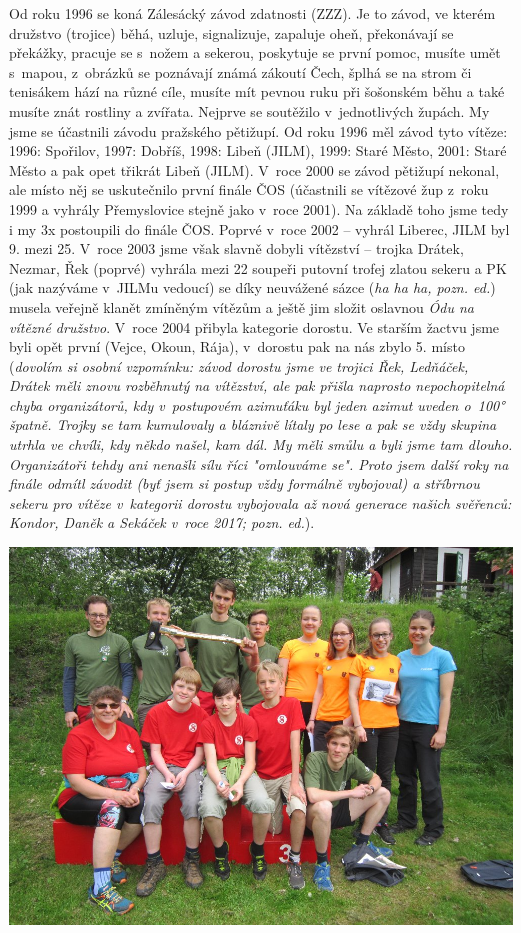 \documentclass[a5paper, 11pt, twoside]{article}
\begin{document}
Od roku 1996 se koná Zálesácký závod zdatnosti (ZZZ). Je to závod, ve
kterém družstvo (trojice) běhá, uzluje, signalizuje, zapaluje oheň,
překonávají se překážky, pracuje se s~nožem a sekerou, poskytuje se
první pomoc, musíte umět s~mapou, z~obrázků se poznávají známá zákoutí
Čech, šplhá se na strom či tenisákem hází na různé cíle, musíte mít
pevnou ruku při šošonském běhu a také musíte znát rostliny a zvířata.
Nejprve se soutěžilo v~jednotlivých župách. My jsme se účastnili závodu
pražského pětižupí. Od roku 1996 měl závod tyto vítěze: 1996: Spořilov,
1997: Dobříš, 1998: Libeň (JILM), 1999: Staré Město, 2001: Staré Město a
pak opet třikrát Libeň (JILM). V~roce 2000 se závod pětižupí nekonal,
ale místo něj se uskutečnilo první finále ČOS (účastnili se vítězové žup
z~roku 1999 a vyhrály Přemyslovice stejně jako v~roce 2001). Na základě
toho jsme tedy i my 3x postoupili do finále ČOS. Poprvé v~roce 2002 --
vyhrál Liberec, JILM byl 9. mezi 25. V~roce 2003 jsme však slavně dobyli
vítězství -- trojka Drátek, Nezmar, Řek (poprvé) vyhrála mezi 22 soupeři
putovní trofej zlatou sekeru a PK (jak nazýváme v~JILMu vedoucí) se díky
neuvážené sázce (\textit{ha ha ha, pozn. ed.}) musela veřejně klanět
zmíněným vítězům a ještě jim složit oslavnou \textit{Ódu na vítězné
družstvo}. V~roce 2004 přibyla kategorie dorostu. Ve starším žactvu jsme
byli opět první (Vejce, Okoun, Rája), v~dorostu pak na nás zbylo 5.
místo (\textit{dovolím si osobní vzpomínku: závod dorostu jsme ve trojici
Řek, Ledňáček, Drátek měli znovu rozběhnutý na vítězství, ale pak přišla
naprosto nepochopitelná chyba organizátorů, kdy v~postupovém azimuťáku
byl jeden azimut uveden o~100° špatně. Trojky se tam kumulovaly a
bláznivě lítaly po lese a pak se vždy skupina utrhla ve chvíli, kdy
někdo našel, kam dál. My měli smůlu a byli jsme tam dlouho. Organizátoři
tehdy ani nenašli sílu říci "omlouváme se". Proto jsem další roky na
finále odmítl závodit (byť jsem si postup vždy formálně vybojoval) a
stříbrnou sekeru pro vítěze v~kategorii dorostu vybojovala až nová
generace našich svěřenců: Kondor, Daněk a Sekáček v~roce 2017; pozn.
ed.}).

 \includegraphics[width=\textwidth]{img/81_zzz.JPG}
\end{document}
